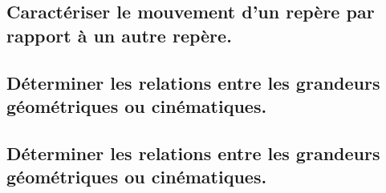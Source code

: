 \documentclass[10pt,fleqn]{book}
\newcommand{\repRel}{../..}
\newcommand{\repStyle}{\repRel/Style}
\newcommand{\td}{fichier_td}
\newcommand{\repExos}{\repRel/ExercicesCompetences}
\newcommand{\repExo}{dossier}
\begin{document}
\subsection{Caractériser le mouvement d’un repère par rapport à un autre repère.} 

\subsection{Déterminer les relations entre les grandeurs géométriques ou cinématiques. } 

\subsection{Déterminer les relations entre les grandeurs géométriques ou cinématiques. } 

\renewcommand{\repExo}{\repExos/C2_MettreEnOeuvreDemarche/C2_06_DeterminerLoisES/10_PompePalette}
\renewcommand{\td}{10_PompePalette}
\graphicspath{{\repStyle/png/}{\repExo/images/}}


\renewcommand{\repExo}{\repExos/C2_MettreEnOeuvreDemarche/C2_06_DeterminerLoisES/11_PompePistonsRadiaux}
\renewcommand{\td}{11_PompePistonsRadiaux}
\graphicspath{{\repStyle/png/}{\repExo/images/}}


\renewcommand{\repExo}{\repExos/C2_MettreEnOeuvreDemarche/C2_06_DeterminerLoisES/12_BielleManivelle}
\renewcommand{\td}{12_BielleManivelle}
\graphicspath{{\repStyle/png/}{\repExo/images/}}


\renewcommand{\repExo}{\repExos/C2_MettreEnOeuvreDemarche/C2_06_DeterminerLoisES/13_TransfoMouvement}
\renewcommand{\td}{13_TransfoMouvement}
\graphicspath{{\repStyle/png/}{\repExo/images/}}


\renewcommand{\repExo}{\repExos/C2_MettreEnOeuvreDemarche/C2_06_DeterminerLoisES/14_Sympact}
\renewcommand{\td}{14_Sympact}
\graphicspath{{\repStyle/png/}{\repExo/images/}}


\renewcommand{\repExo}{\repExos/C2_MettreEnOeuvreDemarche/C2_06_DeterminerLoisES/15_SympactGalet}
\renewcommand{\td}{15_SympactGalet}
\graphicspath{{\repStyle/png/}{\repExo/images/}}


\renewcommand{\repExo}{\repExos/C2_MettreEnOeuvreDemarche/C2_06_DeterminerLoisES/16_Poussoir}
\renewcommand{\td}{16_Poussoir}
\graphicspath{{\repStyle/png/}{\repExo/images/}}

\end{document}
